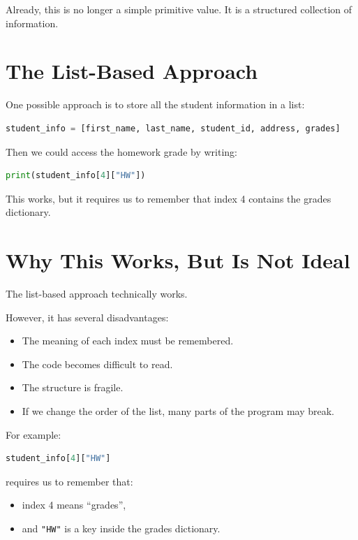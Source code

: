 \documentclass[11pt]{article}
\begin{document}
Already, this is no longer a simple primitive value. It is a structured collection of information.

\section{The List-Based Approach}

One possible approach is to store all the student information in a list:

\begin{lstlisting}[language=Python]
student_info = [first_name, last_name, student_id, address, grades]
\end{lstlisting}

Then we could access the homework grade by writing:

\begin{lstlisting}[language=Python]
print(student_info[4]["HW"])
\end{lstlisting}

This works, but it requires us to remember that index 4 contains the grades dictionary.

\section{Why This Works, But Is Not Ideal}

The list-based approach technically works.

However, it has several disadvantages:

\begin{itemize}
    \item The meaning of each index must be remembered.
    \item The code becomes difficult to read.
    \item The structure is fragile.
    \item If we change the order of the list, many parts of the program may break.
\end{itemize}

For example:

\begin{lstlisting}[language=Python]
student_info[4]["HW"]
\end{lstlisting}

requires us to remember that:

\begin{itemize}
    \item index 4 means ``grades'',
    \item and \verb|"HW"| is a key inside the grades dictionary.
\end{itemize}
\end{document}
